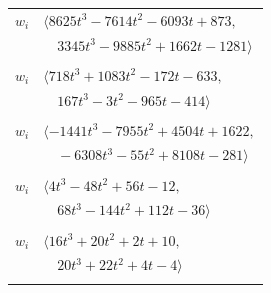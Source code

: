 \documentclass[11pt]{article}
\begin{document}
\begin{longtable}{@{}ll@{}}
$w_i$ & $\langle 8625t^{3}-7614t^{2}-6093t+873,$\\
 & $\quad 3345t^{3}-9885t^{2}+1662t-1281\rangle$\\
\addlinespace[2pt]
\multicolumn{2}{@{}p{0.97\textwidth}@{}}{$i=29$, $D_i=32$, $\rho_{ij}$: $0{:}1, \allowbreak 5{:}1, \allowbreak 7{:}1, \allowbreak 8{:}2, \allowbreak 9{:}2, \allowbreak 10{:}1, \allowbreak 12{:}1, \allowbreak 14{:}1, \allowbreak 32{:}1, \allowbreak 33{:}2, \allowbreak 40{:}2, \allowbreak 45{:}1, \allowbreak 47{:}1, \allowbreak 50{:}2, \allowbreak 54{:}2$}\\
$w_i$ & $\langle 718t^{3}+1083t^{2}-172t-633,$\\
 & $\quad 167t^{3}-3t^{2}-965t-414\rangle$\\
\addlinespace[2pt]
\multicolumn{2}{@{}p{0.97\textwidth}@{}}{$i=30$, $D_i=16$, $\rho_{ij}$: $0{:}1, \allowbreak 7{:}1, \allowbreak 10{:}1, \allowbreak 11{:}1, \allowbreak 16{:}2, \allowbreak 25{:}2, \allowbreak 31{:}1, \allowbreak 44{:}1, \allowbreak 45{:}1, \allowbreak 46{:}2, \allowbreak 47{:}1, \allowbreak 48{:}2, \allowbreak 50{:}2, \allowbreak 51{:}1, \allowbreak 52{:}1$}\\
$w_i$ & $\langle -1441t^{3}-7955t^{2}+4504t+1622,$\\
 & $\quad -6308t^{3}-55t^{2}+8108t-281\rangle$\\
\addlinespace[2pt]
\multicolumn{2}{@{}p{0.97\textwidth}@{}}{$i=31$, $D_i=2$, $\rho_{ij}$: $5{:}1, \allowbreak 9{:}1, \allowbreak 11{:}2, \allowbreak 20{:}2, \allowbreak 30{:}2, \allowbreak 40{:}2, \allowbreak 46{:}1, \allowbreak 47{:}1, \allowbreak 54{:}1, \allowbreak 58{:}1$}\\
$w_i$ & $\langle 4t^{3}-48t^{2}+56t-12,$\\
 & $\quad 68t^{3}-144t^{2}+112t-36\rangle$\\
\addlinespace[2pt]
\multicolumn{2}{@{}p{0.97\textwidth}@{}}{$i=32$, $D_i=2$, $\rho_{ij}$: $1{:}1, \allowbreak 5{:}1, \allowbreak 6{:}2, \allowbreak 8{:}1, \allowbreak 10{:}2, \allowbreak 17{:}1, \allowbreak 21{:}2, \allowbreak 29{:}2, \allowbreak 40{:}1, \allowbreak 42{:}1, \allowbreak 43{:}1$}\\
$w_i$ & $\langle 16t^{3}+20t^{2}+2t+10,$\\
 & $\quad 20t^{3}+22t^{2}+4t-4\rangle$\\
\addlinespace[2pt]
\multicolumn{2}{@{}p{0.97\textwidth}@{}}{$i=33$, $D_i=2$, $\rho_{ij}$: $2{:}2, \allowbreak 9{:}1, \allowbreak 10{:}1, \allowbreak 12{:}1, \allowbreak 20{:}2, \allowbreak 29{:}1, \allowbreak 43{:}2, \allowbreak 44{:}2, \allowbreak 49{:}2$}\\

\end{longtable}
\end{document}
